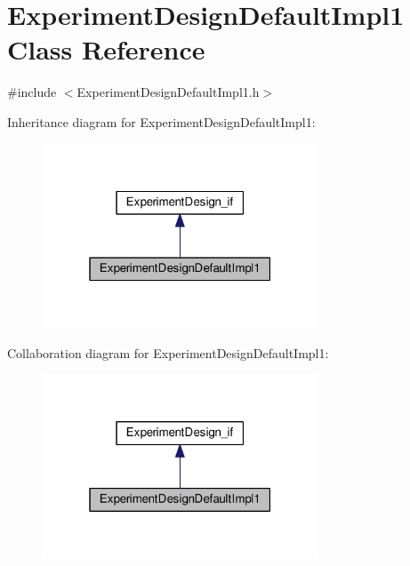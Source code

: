 \hypertarget{class_experiment_design_default_impl1}{}\section{Experiment\+Design\+Default\+Impl1 Class Reference}
\label{class_experiment_design_default_impl1}


{\ttfamily \#include $<$Experiment\+Design\+Default\+Impl1.\+h$>$}



Inheritance diagram for Experiment\+Design\+Default\+Impl1\+:
\nopagebreak
\begin{figure}[H]
\begin{center}
\leavevmode
\includegraphics[width=232pt]{class_experiment_design_default_impl1__inherit__graph}
\end{center}
\end{figure}


Collaboration diagram for Experiment\+Design\+Default\+Impl1\+:
\nopagebreak
\begin{figure}[H]
\begin{center}
\leavevmode
\includegraphics[width=232pt]{class_experiment_design_default_impl1__coll__graph}
\end{center}
\end{figure}
